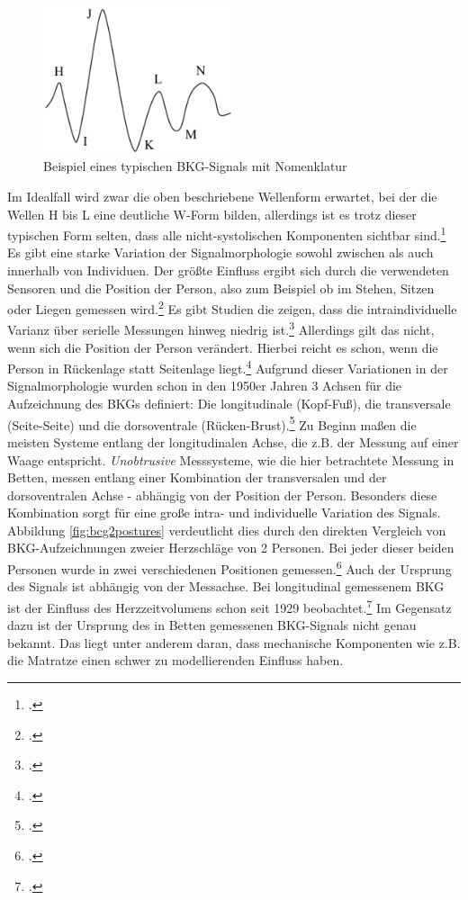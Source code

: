 	\begin{figure}[H]
		\centering
		\includegraphics[width=0.5\textwidth]{pic/bcgWaveform.png}
		\caption[Beispiel eines typischen \ac{BKG}-Signals mit Nomenklatur]{Beispiel eines typischen \ac{BKG}-Signals mit Nomenklatur\protect\footnotemark}
		\label{fig:bcgwaveform}
	\end{figure}
	
	Im Idealfall wird zwar die oben beschriebene Wellenform erwartet, bei der die Wellen H bis L eine deutliche W-Form bilden, allerdings ist es trotz dieser typischen Form selten, dass alle nicht-systolischen Komponenten sichtbar sind.\footcite[Vgl.][]{Pinheiro2010} Es gibt eine starke Variation der Signalmorphologie sowohl zwischen als auch innerhalb von Individuen. Der größte Einfluss ergibt sich durch die verwendeten Sensoren und die Position der Person, also zum Beispiel ob im Stehen, Sitzen oder Liegen gemessen wird.\footcite[Vgl.][]{Sadek2019} Es gibt Studien die zeigen, dass die intraindividuelle Varianz über serielle Messungen hinweg niedrig ist.\footcite[Vgl.][]{Inan2015} Allerdings gilt das nicht, wenn sich die Position der Person verändert. Hierbei reicht es schon, wenn die Person in Rückenlage statt Seitenlage liegt.\footcite[Vgl.][]{Bruser2011} Aufgrund dieser Variationen in der Signalmorphologie wurden schon in den 1950er Jahren 3 Achsen für die Aufzeichnung des \ac{BKG}s definiert: Die longitudinale (Kopf-Fuß), die transversale (Seite-Seite) und die dorsoventrale (Rücken-Brust).\footcite[][Vgl.]{Bruser2011, Inan2015} Zu Beginn maßen die meisten Systeme entlang der longitudinalen Achse, die z.B. der Messung auf einer Waage entspricht. \textit{Unobtrusive} Messsysteme, wie die hier betrachtete Messung in Betten, messen entlang einer Kombination der transversalen und der dorsoventralen Achse - abhängig von der Position der Person. Besonders diese Kombination sorgt für eine große intra- und individuelle Variation des Signals. Abbildung \ref{fig:bcg2postures} verdeutlicht dies durch den direkten Vergleich von \ac{BKG}-Aufzeichnungen zweier Herzschläge von 2 Personen. Bei jeder dieser beiden Personen wurde in zwei verschiedenen Positionen gemessen.\footcite{Bruser2011} Auch der Ursprung des Signals ist abhängig von der Messachse. Bei longitudinal gemessenem \ac{BKG} ist der Einfluss des Herzzeitvolumens schon seit 1929 beobachtet.\footcite[Vgl.][]{Starr1939} Im Gegensatz dazu ist der Ursprung des in Betten gemessenen \ac{BKG}-Signals nicht genau bekannt. Das liegt unter anderem daran, dass mechanische Komponenten wie z.B. die Matratze einen schwer zu modellierenden Einfluss haben.
	
